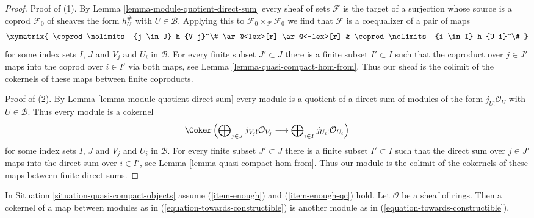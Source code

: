 \begin{proof}
Proof of (1). By Lemma \ref{lemma-module-quotient-direct-sum}
every sheaf of sets $\mathcal{F}$ is the target of a surjection whose source
is a coprod $\mathcal{F}_0$
of sheaves the form $h_{U}^\#$ with $U \in \mathcal{B}$.
Applying this to $\mathcal{F}_0 \times_\mathcal{F} \mathcal{F}_0$
we find that $\mathcal{F}$ is a coequalizer of a pair of maps
$$
\xymatrix{
\coprod\nolimits_{j \in J} h_{V_j}^\#
\ar@<1ex>[r] \ar@<-1ex>[r] &
\coprod\nolimits_{i \in I} h_{U_i}^\#
}
$$
for some index sets $I$, $J$ and $V_j$ and $U_i$ in $\mathcal{B}$.
For every finite subset $J' \subset J$ there is a finite subset
$I' \subset I$ such that the coproduct over $j \in J'$ maps into
the coprod over $i \in I'$ via both maps, see
Lemma \ref{lemma-quasi-compact-hom-from}.
Thus our sheaf is the colimit of the cokernels of these maps
between finite coproducts.

\medskip\noindent
Proof of (2).
By Lemma \ref{lemma-module-quotient-direct-sum}
every module is a quotient of a direct sum of modules of the form
$j_{U!}\mathcal{O}_U$ with $U \in \mathcal{B}$. Thus every module
is a cokernel
$$
\Coker\left(
\bigoplus\nolimits_{j \in J} j_{V_j!}\mathcal{O}_{V_j}
\longrightarrow
\bigoplus\nolimits_{i \in I} j_{U_i!}\mathcal{O}_{U_i}
\right)
$$
for some index sets $I$, $J$ and $V_j$ and $U_i$ in $\mathcal{B}$.
For every finite subset $J' \subset J$ there is a finite subset
$I' \subset I$ such that the direct sum over $j \in J'$ maps into
the direct sum over $i \in I'$, see
Lemma \ref{lemma-quasi-compact-hom-from}.
Thus our module is the colimit of the cokernels of these maps
between finite direct sums.
\end{proof}

\begin{lemma}
\label{lemma-cokernel-map-towards-constructibles}
In Situation \ref{situation-quasi-compact-objects} assume
(\ref{item-enough}) and (\ref{item-enough-qc}) hold.
Let $\mathcal{O}$ be a sheaf of rings.
Then a cokernel of a map between modules as in
(\ref{equation-towards-constructible}) is another module as
in (\ref{equation-towards-constructible}).
\end{lemma}

